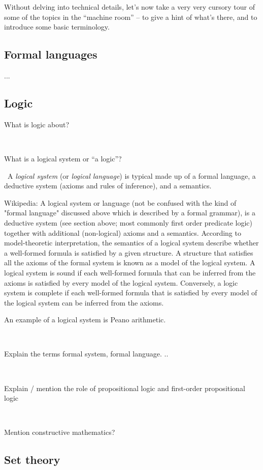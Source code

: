 Without delving into technical details, let's now take a very very cursory tour of some of the topics in the ``machine room'' -- to give a hint of what's there, and to introduce some basic terminology.

\subsection{Formal languages}

...

\subsection{Logic}

What is logic about?

\

What is a logical system or ``a logic''?

\
A \emph{logical system} (or \emph{logical language}) is typical made up of a formal language, a deductive system (axioms and rules of inference), and a semantics.

Wikipedia: A logical system or language (not be confused with the kind of "formal language" discussed above which is described by a formal grammar), is a deductive system (see section above; most commonly first order predicate logic) together with additional (non-logical) axioms and a semantics.
According to model-theoretic interpretation, the semantics of a logical system describe whether a well-formed formula is satisfied by a given structure.
A structure that satisfies all the axioms of the formal system is known as a model of the logical system.
A logical system is sound if each well-formed formula that can be inferred from the axioms is satisfied by every model of the logical system.
Conversely, a logic system is complete if each well-formed formula that is satisfied by every model of the logical system can be inferred from the axioms.

An example of a logical system is Peano arithmetic.

\

Explain the terms formal system, formal language.
..

\

Explain / mention the role of propositional logic and first-order propositional logic

\

Mention constructive mathematics?

\subsection{Set theory}


